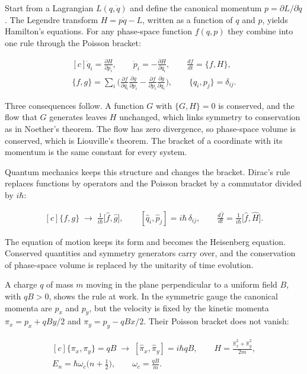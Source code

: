 \documentclass[11pt,oneside]{book}
\newenvironment{centeredalign}{\[\begin{gathered}[c]}{\end{gathered}\]}
\begin{document}
Start from a Lagrangian \(L(q,\dot q)\) and define the canonical momentum \(p=\partial L/\partial\dot q\). The Legendre transform \(H=p\dot q-L\), written as a function of \(q\) and \(p\), yields Hamilton's equations. For any phase-space function \(f(q,p)\) they combine into one rule through the Poisson bracket:

\begin{centeredalign}
\dot q_i=\frac{\partial H}{\partial p_i},\qquad \dot p_i=-\frac{\partial H}{\partial q_i},
\qquad \frac{df}{dt}=\{f,H\},\\
\{f,g\}=\sum_i\Big(\frac{\partial f}{\partial q_i}\frac{\partial g}{\partial p_i}
-\frac{\partial f}{\partial p_i}\frac{\partial g}{\partial q_i}\Big),\qquad \{q_i,p_j\}=\delta_{ij}.
\end{centeredalign}

Three consequences follow. A function \(G\) with \(\{G,H\}=0\) is conserved, and the flow that \(G\) generates leaves \(H\) unchanged, which links symmetry to conservation as in Noether's theorem. The flow has zero divergence, so phase-space volume is conserved, which is Liouville's theorem. The bracket of a coordinate with its momentum is the same constant for every system.

Quantum mechanics keeps this structure and changes the bracket. Dirac's rule replaces functions by operators and the Poisson bracket by a commutator divided by \(i\hbar\):

\begin{centeredalign}
\{f,g\}\;\longrightarrow\;\frac{1}{i\hbar}\big[\hat f,\hat g\big],\qquad
[\hat q_i,\hat p_j]=i\hbar\,\delta_{ij},\qquad
\frac{d\hat f}{dt}=\frac{1}{i\hbar}\big[\hat f,\hat H\big].
\end{centeredalign}

The equation of motion keeps its form and becomes the Heisenberg equation. Conserved quantities and symmetry generators carry over, and the conservation of phase-space volume is replaced by the unitarity of time evolution.

A charge \(q\) of mass \(m\) moving in the plane perpendicular to a uniform field \(B\), with \(qB>0\), shows the rule at work. In the symmetric gauge the canonical momenta are \(p_x\) and \(p_y\), but the velocity is fixed by the kinetic momenta \(\pi_x=p_x+qBy/2\) and \(\pi_y=p_y-qBx/2\). Their Poisson bracket does not vanish:

\begin{centeredalign}
\{\pi_x,\pi_y\}=qB\;\longrightarrow\;[\hat\pi_x,\hat\pi_y]=i\hbar qB,\qquad
H=\frac{\hat\pi_x^2+\hat\pi_y^2}{2m},\\
E_n=\hbar\omega_c\Big(n+\frac12\Big),\qquad \omega_c=\frac{qB}{m}.
\end{centeredalign}
\end{document}
